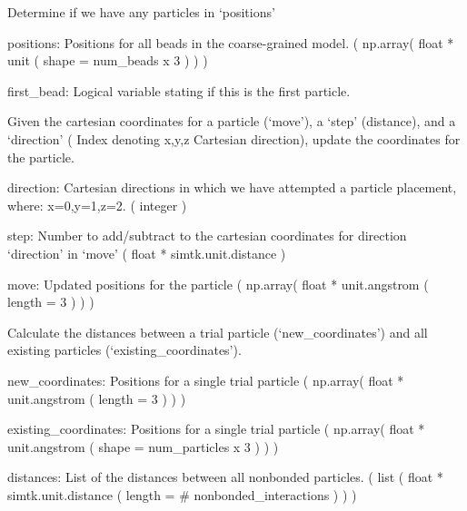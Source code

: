 \documentclass[letterpaper,10pt,english,openany,oneside]{sphinxmanual}
\begin{document}

\begin{fulllineitems}
\label{\detokenize{util:util.first_bead}}
Determine if we have any particles in ‘positions’

positions: Positions for all beads in the coarse-grained model.
( np.array( float * unit ( shape = num\_beads x 3 ) ) )

first\_bead: Logical variable stating if this is the first particle.

\end{fulllineitems}


\begin{fulllineitems}
\label{\detokenize{util:util.get_move}}
Given the cartesian coordinates for a particle (‘move’),
a ‘step’ (distance), and a ‘direction’ ( Index denoting
x,y,z Cartesian direction), update the coordinates for
the particle.

direction: Cartesian directions in which we have attempted 
a particle placement, where: x=0,y=1,z=2. 
( integer )

step: Number to add/subtract to the cartesian coordinates
for direction ‘direction’ in ‘move’
( float * simtk.unit.distance )

move: Updated positions for the particle
( np.array( float * unit.angstrom ( length = 3 ) ) )

\end{fulllineitems}


\begin{fulllineitems}
\label{\detokenize{util:util.non_bonded_distances}}
Calculate the distances between a trial particle (‘new\_coordinates’)
and all existing particles (‘existing\_coordinates’).

new\_coordinates: Positions for a single trial particle
( np.array( float * unit.angstrom ( length = 3 ) ) )

existing\_coordinates: Positions for a single trial particle
( np.array( float * unit.angstrom ( shape = num\_particles x 3 ) ) )

distances: List of the distances between all nonbonded particles.
( list ( float * simtk.unit.distance ( length = \# nonbonded\_interactions ) ) )

\end{fulllineitems}
\end{document}
